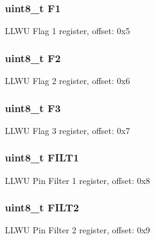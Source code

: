 \subsubsection[{F1}]{\setlength{\rightskip}{0pt plus 5cm}uint8\+\_\+t F1}\label{struct_l_l_w_u___mem_map_a17c6af91d19273c2d4bcf3ae4329cf17}
L\+L\+W\+U Flag 1 register, offset\+: 0x5 \hypertarget{struct_l_l_w_u___mem_map_a83314474ef7d8093c7869a49c32dec41}{}
\subsubsection[{F2}]{\setlength{\rightskip}{0pt plus 5cm}uint8\+\_\+t F2}\label{struct_l_l_w_u___mem_map_a83314474ef7d8093c7869a49c32dec41}
L\+L\+W\+U Flag 2 register, offset\+: 0x6 \hypertarget{struct_l_l_w_u___mem_map_a74cbe8b1b307a4c6bde8204cadc843d8}{}
\subsubsection[{F3}]{\setlength{\rightskip}{0pt plus 5cm}uint8\+\_\+t F3}\label{struct_l_l_w_u___mem_map_a74cbe8b1b307a4c6bde8204cadc843d8}
L\+L\+W\+U Flag 3 register, offset\+: 0x7 \hypertarget{struct_l_l_w_u___mem_map_a7c43ef6579145dec9eea84491cdee65e}{}
\subsubsection[{F\+I\+L\+T1}]{\setlength{\rightskip}{0pt plus 5cm}uint8\+\_\+t F\+I\+L\+T1}\label{struct_l_l_w_u___mem_map_a7c43ef6579145dec9eea84491cdee65e}
L\+L\+W\+U Pin Filter 1 register, offset\+: 0x8 \hypertarget{struct_l_l_w_u___mem_map_ab5062701836ebab5ede5a14e163d6c2a}{}
\subsubsection[{F\+I\+L\+T2}]{\setlength{\rightskip}{0pt plus 5cm}uint8\+\_\+t F\+I\+L\+T2}\label{struct_l_l_w_u___mem_map_ab5062701836ebab5ede5a14e163d6c2a}
L\+L\+W\+U Pin Filter 2 register, offset\+: 0x9 \hypertarget{struct_l_l_w_u___mem_map_a44a00f9c297b510a86f67182a14a8791}{}
